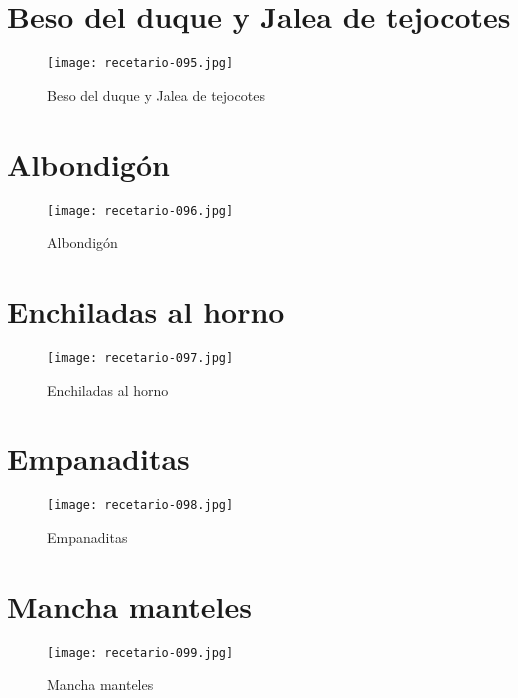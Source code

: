 \documentclass[12pt,letterpaper]{article}
\begin{document}
\section{Beso del duque y Jalea de tejocotes}
  \begin{figure}[H]
    \vspace{2pt}
  \texttt{[image: recetario-095.jpg]}
    \caption{Beso del duque y Jalea de tejocotes}
    
  \end{figure}

\newpage

\section{Albondigón}
  \begin{figure}[H]
    \vspace{2pt}
  \texttt{[image: recetario-096.jpg]}
    \caption{Albondigón}
    
  \end{figure}
  
\newpage

\section{Enchiladas al horno}
  \begin{figure}[H]
    \vspace{2pt}
  \texttt{[image: recetario-097.jpg]}
    \caption{Enchiladas al horno}
    
  \end{figure}

\newpage

\section{Empanaditas}
  \begin{figure}[H]
    \vspace{2pt}
  \texttt{[image: recetario-098.jpg]}
    \caption{Empanaditas}
    
  \end{figure}

\newpage

\section{Mancha manteles}
  \begin{figure}[H]
    \vspace{2pt}
  \texttt{[image: recetario-099.jpg]}
    \caption{Mancha manteles}
    
  \end{figure}
\end{document}

